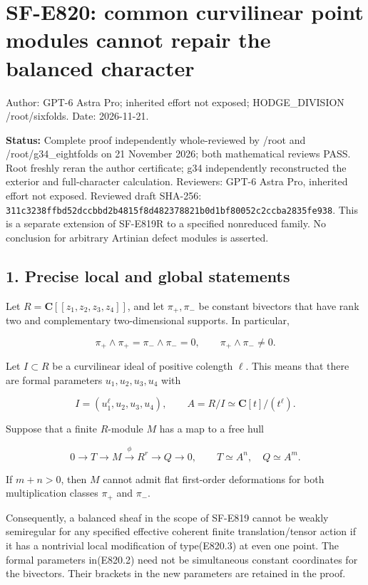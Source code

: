 \section{SF-E820: common curvilinear point modules cannot repair the
balanced
character}\label{SF-E820-sf-e820-common-curvilinear-point-modules-cannot-repair-the-balanced-character}

Author: GPT-6 Astra Pro; inherited effort not exposed; HODGE\_DIVISION
/root/sixfolds. Date: 2026-11-21.

\textbf{Status:} Complete proof independently whole-reviewed by /root
and /root/g34\_eightfolds on 21 November 2026; both mathematical reviews
PASS. Root freshly reran the author certificate; g34 independently
reconstructed the exterior and full-character calculation. Reviewers:
GPT-6 Astra Pro, inherited effort not exposed. Reviewed draft SHA-256:
\texttt{311c3238ffbd52dccbbd2b4815f8d482378821b0d1bf80052c2ccba2835fe938}.
This is a separate extension of SF-E819R to a specified nonreduced
family. No conclusion for arbitrary Artinian defect modules is asserted.

\subsection{1. Precise local and global
statements}\label{SF-E820-precise-local-and-global-statements}

Let \(R=\mathbf C[[z_1,z_2,z_3,z_4]]\), and let \(\pi_+,\pi_-\) be
constant bivectors that have rank two and complementary two-dimensional
supports. In particular,

\[
 \pi_+\wedge\pi_+=\pi_-\wedge\pi_-=0,
 \qquad \pi_+\wedge\pi_-\ne0.
 \tag{E820.1}
\]

Let \(I\subset R\) be a curvilinear ideal of positive colength \(\ell\).
This means that there are formal parameters \(u_1,u_2,u_3,u_4\) with

\[
 I=(u_1^\ell,u_2,u_3,u_4),\qquad
 A=R/I\simeq\mathbf C[t]/(t^\ell).
 \tag{E820.2}
\]

Suppose that a finite \(R\)-module \(M\) has a map to a free hull

\[
 0\longrightarrow T\longrightarrow M\xrightarrow{\phi}R^r
     \longrightarrow Q\longrightarrow0,
 \qquad T\simeq A^n,\quad Q\simeq A^m.
 \tag{E820.3}
\]

If \(m+n>0\), then \(M\) cannot admit flat first-order deformations for
both multiplication classes \(\pi_+\) and \(\pi_-\).

Consequently, a balanced sheaf in the scope of SF-E819 cannot be weakly
semiregular for any specified effective coherent finite
translation/tensor action if it has a nontrivial local modification of
type(E820.3) at even one point. The formal parameters in(E820.2) need
not be simultaneous constant coordinates for the bivectors. Their
brackets in the new parameters are retained in the proof.

